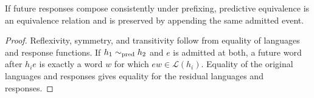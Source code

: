 \setcounter{theorem}{0}
\begin{proposition}
If future responses compose consistently under prefixing, predictive equivalence is an equivalence relation and is preserved by appending the same admitted event.
\end{proposition}
\begin{proof}
Reflexivity, symmetry, and transitivity follow from equality of languages and response functions. If $h_1\sim_{\rm pred}h_2$ and $e$ is admitted at both, a future word after $h_i e$ is exactly a word $w$ for which $ew\in\mathcal L(h_i)$. Equality of the original languages and responses gives equality for the residual languages and responses.
\end{proof}
